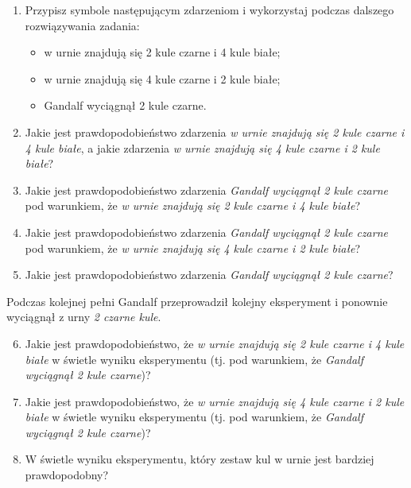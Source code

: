 \documentclass[twoside]{mwart}
\newcommand{\ans}[1]{}
\newenvironment{ansenv}{\comment}{\endcomment}
\newenvironment{ansenv}{\paragraph{Odpowiedź:}}{}
\newcommand{\ans}[1]{\begin{ansenv}#1\end{ansenv}}
\begin{document}
\begin{enumerate}
	\begin{enumerate}
		\item Przypisz symbole następującym zdarzeniom i wykorzystaj podczas dalszego rozwiązywania zadania:
		\begin{itemize}
			\item w urnie znajdują się 2 kule czarne i 4 kule białe; \ans{$H_1$}
			\item w urnie znajdują się 4 kule czarne i 2 kule białe; \ans{$H_2$}
			\item Gandalf wyciągnął 2 kule czarne.  \ans{$E$}
		\end{itemize}
		\item Jakie jest prawdopodobieństwo  zdarzenia \emph{w urnie znajdują się 2 kule czarne i 4 kule białe}, a jakie zdarzenia \emph{w urnie znajdują się 4 kule czarne i 2 kule białe}?
		\ans{$P(H_1)=\frac{1}{7} \qquad P(H_2)=\frac{6}{7}$}
		\item Jakie jest prawdopodobieństwo  zdarzenia \emph{Gandalf wyciągnął 2 kule czarne} pod warunkiem, że \emph{w urnie znajdują się 2 kule czarne i 4 kule białe}?
		\ans{\[P(E|H_1)=\frac{1}{{6\choose 2}}=\frac{1}{15}\]}
		\item Jakie jest prawdopodobieństwo  zdarzenia \emph{Gandalf wyciągnął 2 kule czarne} pod warunkiem, że \emph{w urnie znajdują się 4 kule czarne i 2 kule białe}?
		\ans{\[P(E|H_2)=\frac{{4\choose 2}}{{6\choose 2}}=\frac{6}{15}\]}
		\item Jakie jest prawdopodobieństwo  zdarzenia \emph{Gandalf wyciągnął 2 kule czarne}?
		\ans{\[P(E)=P(E|H_1)P(H_1)+P(E|H_2)P(H_2)=\frac{1}{15}\frac{1}{7}+\frac{6}{15}\frac{6}{7}=\frac{37}{105}\]}
	\end{enumerate}
	Podczas kolejnej pełni Gandalf przeprowadził kolejny eksperyment i ponownie wyciągnął z urny \emph{2 czarne kule}.
	\begin{enumerate}
		\setcounter{enumii}{5}
		\item Jakie jest prawdopodobieństwo, że \emph{w urnie znajdują się 2 kule czarne i 4 kule białe} w świetle wyniku eksperymentu (tj. pod warunkiem, że \emph{Gandalf wyciągnął 2 kule czarne})?
		\ans{\[P(H_1|E)=\frac{P(E|H_1)P(H_1)}{P(E)}=\frac{\frac{1}{15}\frac{1}{7}}{\frac{37}{105}}=\frac{1}{37} \]}
		\item Jakie jest prawdopodobieństwo, że \emph{w urnie znajdują się 4 kule czarne i 2 kule białe} w świetle wyniku eksperymentu (tj. pod warunkiem, że \emph{Gandalf wyciągnął 2 kule czarne})?
		\ans{\[P(H_2|E)=1-P(H_1|E)=\frac{36}{37} \]}
		\item W świetle wyniku eksperymentu, który zestaw kul w urnie jest bardziej prawdopodobny?
		\ans{Bardziej prawdopodobne jest, że w urnie znajdują się 4 kule czarne i 2 kule białe}
	\end{enumerate}


\end{enumerate}
\end{document}
